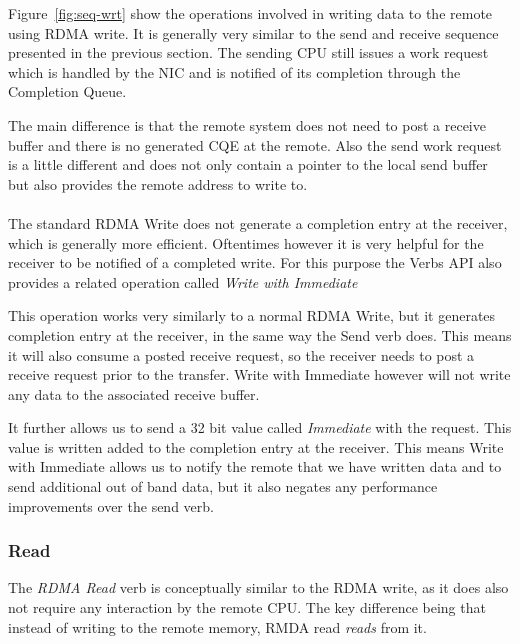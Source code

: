 Figure~\ref{fig:seq-wrt} show the operations involved in writing data to the remote using RDMA write. It is generally very
similar to the send and receive sequence presented in the previous section. The sending CPU still issues a work request which
is handled by the NIC and is notified of its completion through the Completion Queue.

The main difference is that the remote system does not need to post a receive buffer and there is no generated CQE at the 
remote. Also the send work request is a little different and does not only contain a pointer to the local send buffer but
also provides the remote address to write to.

\paragraph{} The standard RDMA Write does not generate a completion entry at the receiver, which is generally more efficient.
Oftentimes however it is very helpful for the receiver to be notified of a completed write. For this purpose the Verbs API 
also provides a related operation called \emph{Write with Immediate}

This operation works very similarly to a normal RDMA Write, but it generates completion entry at the receiver, in the same way 
the Send verb does. This means it will also consume a posted receive request, so the receiver needs to post a receive request 
prior to the transfer. Write with Immediate however will not write any data to the associated receive buffer.

It further allows us to send a 32 bit value called \emph{Immediate} with the request. This value is written added to
the completion entry at the receiver. This means Write with Immediate allows us to notify the remote that we have written data and to 
send additional out of band data, but it also negates any performance improvements over the send verb.


\subsubsection{Read}

The \emph{RDMA Read} verb is conceptually similar to the RDMA write, as it does also not require any interaction by the 
remote CPU. The key difference being that instead of writing to the remote memory, RMDA read \emph{reads} from it.


